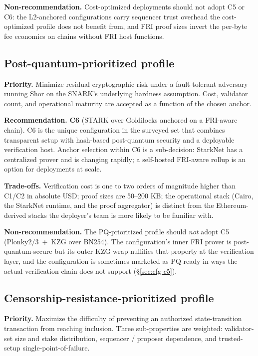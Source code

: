 \textbf{Non-recommendation.} Cost-optimized deployments should not
adopt C5 or C6: the L2-anchored configurations carry sequencer trust
overhead the cost-optimized profile does not benefit from, and FRI
proof sizes invert the per-byte fee economics on chains without FRI
host functions.

\subsection{Post-quantum-prioritized profile}
\label{sec:rec-pq}

\textbf{Priority.} Minimize residual cryptographic risk under a
fault-tolerant adversary running Shor on the SNARK's underlying
hardness assumption. Cost, validator count, and operational maturity
are accepted as a function of the chosen anchor.

\textbf{Recommendation.} \textbf{C6} (STARK over Goldilocks anchored
on a FRI-aware chain). C6 is the unique configuration in the
surveyed set that combines transparent setup with hash-based
post-quantum security and a deployable verification host. Anchor
selection within C6 is a sub-decision: StarkNet has a centralized
prover and is changing rapidly; a self-hosted FRI-aware rollup is an
option for deployments at scale.

\textbf{Trade-offs.} Verification cost is one to two orders of
magnitude higher than C1/C2 in absolute USD; proof sizes are 50--200
KB; the operational stack (Cairo, the StarkNet runtime, and the
proof aggregator) is distinct from the Ethereum-derived stacks the
deployer's team is more likely to be familiar with.

\textbf{Non-recommendation.} The PQ-prioritized profile should
\emph{not} adopt C5 (Plonky2/3~+~KZG over BN254). The configuration's
inner FRI prover is post-quantum-secure but its outer KZG wrap
nullifies that property at the verification layer, and the
configuration is sometimes marketed as PQ-ready in ways the actual
verification chain does not support
(\S\ref{sec:cfg-c5}).

\subsection{Censorship-resistance-prioritized profile}
\label{sec:rec-censorship}

\textbf{Priority.} Maximize the difficulty of preventing an
authorized state-transition transaction from reaching inclusion.
Three sub-properties are weighted: validator-set size and stake
distribution, sequencer / proposer dependence, and trusted-setup
single-point-of-failure.

